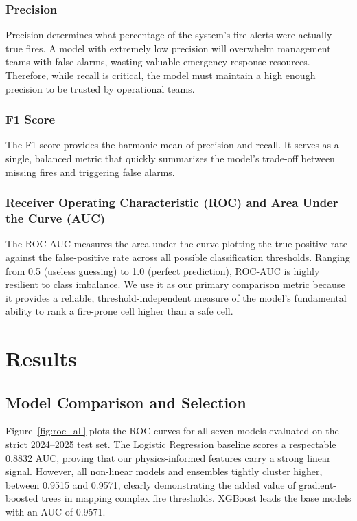 \documentclass[11pt]{article}
\begin{document}
\subsubsection{Precision}

Precision determines what percentage of the system's fire alerts were actually true fires. A model with extremely low precision will overwhelm management teams with false alarms, wasting valuable emergency response resources. Therefore, while recall is critical, the model must maintain a high enough precision to be trusted by operational teams.

\subsubsection{F1 Score}

The F1 score provides the harmonic mean of precision and recall. It serves as a single, balanced metric that quickly summarizes the model's trade-off between missing fires and triggering false alarms.

\subsubsection{Receiver Operating Characteristic (ROC) and Area Under the Curve (AUC)}

The ROC-AUC measures the area under the curve plotting the true-positive rate against the false-positive rate across all possible classification thresholds. Ranging from 0.5 (useless guessing) to 1.0 (perfect prediction), ROC-AUC is highly resilient to class imbalance. We use it as our primary comparison metric because it provides a reliable, threshold-independent measure of the model's fundamental ability to rank a fire-prone cell higher than a safe cell.

\section{Results}

\subsection{Model Comparison and Selection}

Figure~\ref{fig:roc_all} plots the ROC curves for all seven models evaluated on the strict 2024--2025 test set. The Logistic Regression baseline scores a respectable 0.8832 AUC, proving that our physics-informed features carry a strong linear signal. However, all non-linear models and ensembles tightly cluster higher, between 0.9515 and 0.9571, clearly demonstrating the added value of gradient-boosted trees in mapping complex fire thresholds. XGBoost leads the base models with an AUC of 0.9571.
\end{document}
